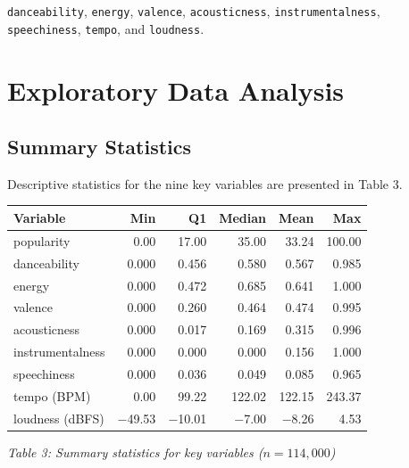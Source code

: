 \documentclass[12pt,a4paper]{article}
\begin{document}
\texttt{danceability}, \texttt{energy}, \texttt{valence},
\texttt{acousticness}, \texttt{instrumentalness},
\texttt{speechiness}, \texttt{tempo}, and \texttt{loudness}.
\section{Exploratory Data Analysis}

\subsection{Summary Statistics}

Descriptive statistics for the nine key variables are presented in
Table 3.

\begin{table}[ht]
\centering

\begin{tabular}{@{}lrrrrr@{}}
\toprule
\textbf{Variable}   & \textbf{Min}  & \textbf{Q1}  & \textbf{Median}
                    & \textbf{Mean} & \textbf{Max} \\
\midrule
popularity          & 0.00  & 17.00  & 35.00  & 33.24  & 100.00 \\
danceability        & 0.000 & 0.456  & 0.580  & 0.567  & 0.985  \\
energy              & 0.000 & 0.472  & 0.685  & 0.641  & 1.000  \\
valence             & 0.000 & 0.260  & 0.464  & 0.474  & 0.995  \\
acousticness        & 0.000 & 0.017  & 0.169  & 0.315  & 0.996  \\
instrumentalness    & 0.000 & 0.000  & 0.000  & 0.156  & 1.000  \\
speechiness         & 0.000 & 0.036  & 0.049  & 0.085  & 0.965  \\
tempo (BPM)         & 0.00  & 99.22  & 122.02 & 122.15 & 243.37 \\
loudness (dBFS)     & $-$49.53 & $-$10.01 & $-$7.00 & $-$8.26 & 4.53 \\
\bottomrule
\end{tabular}

\vspace{0.3cm}

{\centering \textit{Table 3: Summary statistics for key variables ($n = 114{,}000$)}\par}

\label{tab:summary}

\end{table}
\end{document}
